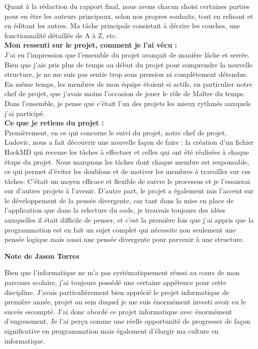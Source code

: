 \documentclass[11pt]{article}
\begin{document}
Quant à la rédaction du rapport final, nous avons chacun choisi certaines parties pour en être les auteurs principaux, selon nos propres souhaits, tout en relisant et en éditant les autres. Ma tâche principale consistait à décrire les couches, une fonctionnalité détaillée de A à Z, etc.\\

\bigbreak
\textbf{ Mon ressenti sur le projet, comment je l’ai vécu :  }\\
J'ai eu l'impression que l'ensemble du projet avançait de manière lâche et serrée. Bien que j'aie pris plus de temps au début du projet pour comprendre la nouvelle structure, je ne me suis pas sentie trop sous pression ni complètement détendue. En même temps, les membres de mon équipe étaient si actifs, en particulier notre chef de projet, que j'avais moins l'occasion de jouer le rôle de Maître du temps. Dans l'ensemble, je pense que c'était l'un des projets les mieux rythmés auxquels j'ai participé.\\

\bigbreak
\textbf{ Ce que je retiens du projet :   }\\
Premièrement, en ce qui concerne le suivi du projet, notre chef de projet, Ludovic, nous a fait découvrir une nouvelle façon de faire : la création d'un fichier HackMD qui recense les tâches à effectuer et celles qui ont été réalisées à chaque étape du projet. Nous marquons les tâches dont chaque membre est responsable, ce qui permet d'éviter les doublons et de motiver les membres à travailler sur ces tâches. C'était un moyen efficace et flexible de suivre le processus et je l'essaierai sur d'autres projets à l'avenir. D'autre part, le projet a également mis l'accent sur le développement de la pensée divergente, car tant dans la mise en place de l'application que dans la relecture du code, je trouvais toujours des idées auxquelles il était difficile de penser, et c'est la première fois que j'ai appris que la programmation est en fait un sujet complet qui nécessite non seulement une pensée logique mais aussi une pensée divergente pour parvenir à une structure. 












\newpage
\textbf{\Large Note de Jason Torres}

Bien que l'informatique ne m'a pas systématiquement réussi au cours de mon parcours scolaire, j'ai toujours possédé une certaine appétence pour cette discipline. J'avais particulièrement bien apprécié le projet informatique de première année, projet au sein duquel je me suis énormément investi avoir eu le succès escompté. J'ai donc abordé ce projet informatique avec énormément d'engouement. Je l'ai perçu comme une réelle opportunité de progresser de façon significative en programmation mais également d'élargir ma culture en informatique.
\end{document}
